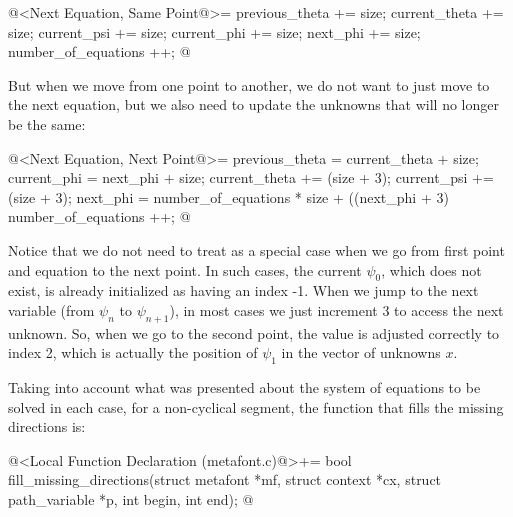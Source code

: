 \iniciocodigo
@<Next Equation, Same Point@>=
{
  previous_theta += size;
  current_theta += size;
  current_psi += size;
  current_phi += size;
  next_phi += size;
  number_of_equations ++;
}
@
\fimcodigo

But when we move from one point to another, we do not want to just
move to the next equation, but we also need to update the unknowns
that will no longer be the same:

\iniciocodigo
@<Next Equation, Next Point@>=
{
  previous_theta = current_theta + size;
  current_phi = next_phi + size;
  current_theta += (size + 3);
  current_psi += (size + 3);
  next_phi = number_of_equations * size + ((next_phi + 3) %
  number_of_equations ++;
}
@
\fimcodigo

Notice that we do not need to treat as a special case when we go from
first point and equation to the next point. In such cases, the current
$\psi_0$, which does not exist, is already initialized as having an
index -1. When we jump to the next variable (from $\psi_{n}$ to
$\psi_{n+1}$), in most cases we just increment 3 to access the next
unknown. So, when we go to the second point, the value is adjusted
correctly to index 2, which is actually the position of $\psi_1$ in
the vector of unknowns $x$.

Taking into account what was presented about the system of equations
to be solved in each case, for a non-cyclical segment, the function
that fills the missing directions is:

\iniciocodigo
@<Local Function Declaration (metafont.c)@>+=
bool fill_missing_directions(struct metafont *mf, struct context *cx,
                             struct path_variable *p, int begin, int end);
@
\fimcodigo

